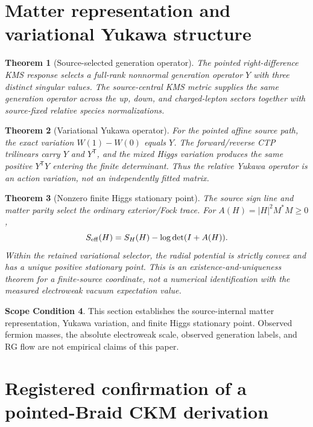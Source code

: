 \documentclass[11pt]{article}
\newtheorem{theorem}{Theorem}[section]
\theoremstyle{definition}
\newtheorem{scope}[theorem]{Scope Condition}
\theoremstyle{remark}
\begin{document}
\section{Matter representation and variational Yukawa structure}

\begin{theorem}[Source-selected generation operator]
The pointed right-difference KMS response selects a full-rank nonnormal generation operator $Y$ with three distinct singular values. The source-central KMS metric supplies the same generation operator across the up, down, and charged-lepton sectors together with source-fixed relative species normalizations.
\end{theorem}

\begin{theorem}[Variational Yukawa operator]
For the pointed affine source path, the exact variation $W(1)-W(0)$ equals $Y$. The forward/reverse CTP trilinears carry $Y$ and $Y^{\mathsf T}$, and the mixed Higgs variation produces the same positive $Y^{\mathsf T}Y$ entering the finite determinant. Thus the relative Yukawa operator is an action variation, not an independently fitted matrix.
\end{theorem}

\begin{theorem}[Nonzero finite Higgs stationary point]
The source sign line and matter parity select the ordinary exterior/Fock trace. For $A(H)=|H|^2M^*M\ge0$,
\begin{equation}
S_{\rm eff}(H)=S_H(H)-\log\det(I+A(H)).
\label{eq:higgsaction}
\end{equation}
Within the retained variational selector, the radial potential is strictly convex and has a unique positive stationary point. This is an existence-and-uniqueness theorem for a finite-source coordinate, not a numerical identification with the measured electroweak vacuum expectation value.
\end{theorem}

\begin{scope}
This section establishes the source-internal matter representation, Yukawa variation, and finite Higgs stationary point. Observed fermion masses, the absolute electroweak scale, observed generation labels, and RG flow are not empirical claims of this paper.
\end{scope}

\section{Registered confirmation of a pointed-Braid CKM derivation}
\end{document}
